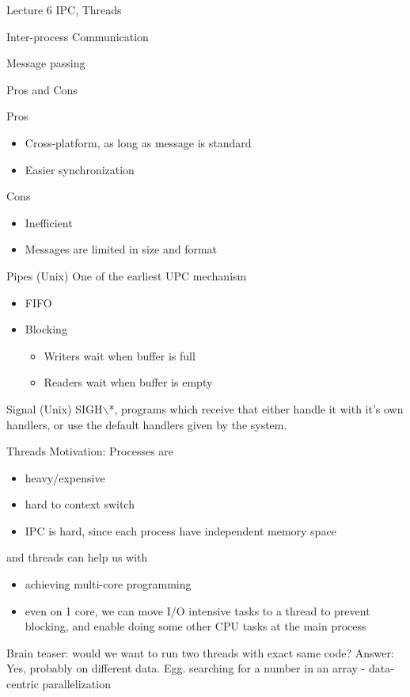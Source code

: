\documentclass[presentation]{beamer}
\begin{document}
\begin{frame}[label={sec:orgb061a4c},fragile]{Lecture 6 IPC, Threads}
\begin{block}{Inter-process Communication}
\begin{block}{Message passing}
\begin{block}{Pros and Cons}
\begin{block}{Pros}
\begin{itemize}
\item Cross-platform, as long as message is standard
\item Easier synchronization
\end{itemize}
\end{block}
\begin{block}{Cons}
\begin{itemize}
\item Inefficient
\item Messages are limited in size and format
\end{itemize}
\end{block}
\end{block}
\end{block}
\begin{block}{Pipes (Unix)}
One of the earliest UPC mechanism
\begin{itemize}
\item FIFO
\item Blocking
\begin{itemize}
\item Writers wait when buffer is full
\item Readers wait when buffer is empty
\end{itemize}
\end{itemize}
\end{block}
\begin{block}{Signal (Unix)}
\alert{SIGH$\backslash$*}, programs which receive that either handle it with it's own handlers, or
 use the default handlers given by the system.
\end{block}
\end{block}
\begin{block}{Threads}
\alert{Motivation}: Processes are
\begin{itemize}
\item heavy/expensive
\item hard to context switch
\item IPC is hard, since each process have independent memory space
\end{itemize}
and threads can help us with
\begin{itemize}
\item achieving multi-core programming
\item even on 1 core, we can move I/O intensive tasks to a thread to prevent
blocking, and enable doing some other CPU tasks at the main process
\end{itemize}

\alert{Brain teaser: would we want to run two threads with exact same code?}
Answer: Yes, probably on different data. Egg. searching for a number in an
array - data-centric parallelization


\end{block}
\end{frame}
\end{document}

